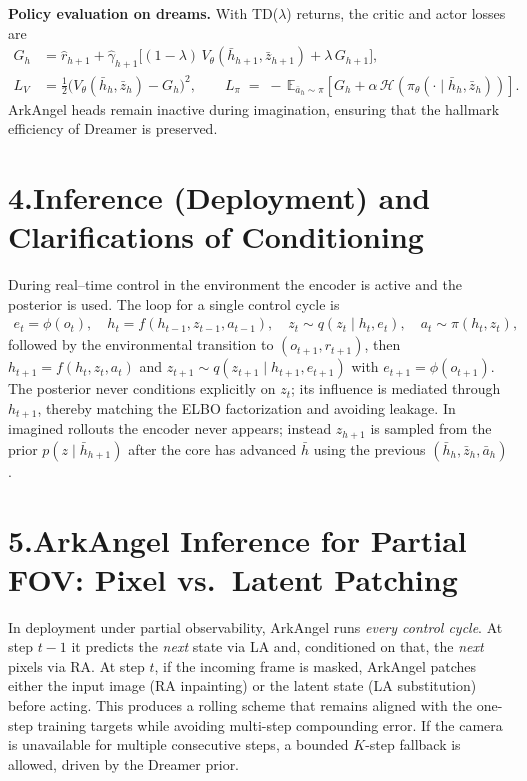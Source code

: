 \documentclass[11pt]{article}
\begin{document}
\textbf{Policy evaluation on dreams.}
With TD($\lambda$) returns, the critic and actor losses are
\begin{align}
G_h &= \hat r_{h+1} + \hat\gamma_{h+1}\Big[(1-\lambda)\,V_\theta(\bar h_{h+1},\bar z_{h+1}) + \lambda\,G_{h+1}\Big], \\
L_V &= \tfrac12\big(V_\theta(\bar h_h,\bar z_h) - G_h\big)^2, \qquad
L_\pi \;=\; -\,\mathbb{E}_{\bar a_h\sim\pi}\left[G_h + \alpha\,\mathcal{H}\!\left(\pi_\theta(\cdot\mid\bar h_h,\bar z_h)\right)\right].
\end{align}
ArkAngel heads remain inactive during imagination, ensuring that the hallmark efficiency of Dreamer is preserved.

\section*{4.\quad Inference (Deployment) and Clarifications of Conditioning}

During real--time control in the environment the encoder is active and the posterior is used. The loop for a single control cycle is
\begin{align}
e_t=\phi(o_t), \quad h_t=f(h_{t-1},z_{t-1},a_{t-1}), \quad z_t\sim q(z_t\mid h_t,e_t), \quad a_t\sim \pi(h_t,z_t),
\end{align}
followed by the environmental transition to $(o_{t+1},r_{t+1})$, then $h_{t+1}=f(h_t,z_t,a_t)$ and $z_{t+1}\sim q(z_{t+1}\mid h_{t+1},e_{t+1})$ with $e_{t+1}=\phi(o_{t+1})$. The posterior never conditions explicitly on $z_t$; its influence is mediated through $h_{t+1}$, thereby matching the ELBO factorization and avoiding leakage. In imagined rollouts the encoder never appears; instead $z_{h+1}$ is sampled from the prior $p(z\mid \bar h_{h+1})$ after the core has advanced $\bar h$ using the previous $(\bar h_h,\bar z_h,\bar a_h)$.

\section*{5.\quad ArkAngel Inference for Partial FOV: Pixel vs.\ Latent Patching}

In deployment under partial observability, ArkAngel runs \emph{every control cycle}. At step $t{-}1$ it predicts the \emph{next} state via LA and, conditioned on that, the \emph{next} pixels via RA. At step $t$, if the incoming frame is masked, ArkAngel patches either the input image (RA inpainting) or the latent state (LA substitution) before acting. This produces a rolling scheme that remains aligned with the one-step training targets while avoiding multi-step compounding error. If the camera is unavailable for multiple consecutive steps, a bounded $K$-step fallback is allowed, driven by the Dreamer prior.
\end{document}
